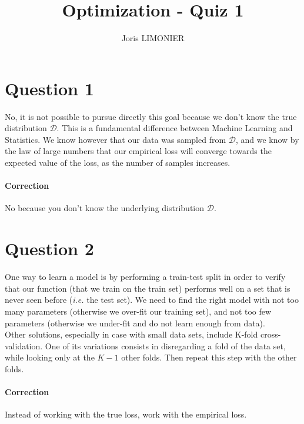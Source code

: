 \documentclass{article}
\title{Optimization - Quiz 1}
\author{Joris LIMONIER}
\newcommand{\1}{\mathbf{1}}
\newcommand{\ie}{\textit{i.e. }}
\begin{document}
\maketitle
      
\section{Question 1}
No, it is not possible to pursue directly this goal because we don't know the true distribution \(\mathcal{D}\). This is a fundamental difference between Machine Learning and Statistics. We know however that our data was sampled from \(\mathcal{D}\), and we know by the law of large numbers that our empirical loss will converge towards the expected value of the loss, as the number of samples increases.
\paragraph{Correction} No because you don't know the underlying distribution \(\mathcal{D}\).

\section{Question 2}
One way to learn a model is by performing a train-test split in order to verify that our function (that we train on the train set) performs well on a set that is never seen before (\ie the test set). We need to find the right model with not too many parameters (otherwise we over-fit our training set), and not too few parameters (otherwise we under-fit and do not learn enough from data). \\
Other solutions, especially in case with small data sets, include K-fold cross-validation. One of its variations consists in disregarding a fold of the data set, while looking only at the \(K-1\) other folds. Then repeat this step with the other folds.
\paragraph{Correction} Instead of working with the true loss, work with the empirical loss.
\end{document}
